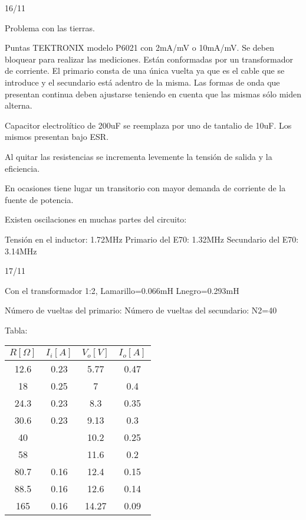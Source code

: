 16/11

Problema con las tierras.

Puntas TEKTRONIX modelo P6021 con 2mA/mV o 10mA/mV. Se deben bloquear para realizar las mediciones.
Están conformadas por un transformador de corriente. 
El primario consta de una única vuelta ya que es el cable que se introduce y el secundario está adentro de la misma. 
Las formas de onda que presentan continua deben ajustarse teniendo en cuenta que las mismas sólo miden alterna. 

Capacitor electrolítico de 200uF se reemplaza por uno de tantalio de 10uF. Los mismos presentan bajo ESR. 

Al quitar las resistencias se incrementa levemente la tensión de salida y la eficiencia. 

En ocasiones tiene lugar un transitorio con mayor demanda de corriente de la fuente de potencia. 

Existen oscilaciones en muchas partes del circuito:

Tensión en el inductor: 1.72MHz
Primario del E70: 1.32MHz
Secundario del E70: 3.14MHz

17/11

Con el transformador 1:2, 
Lamarillo=0.066mH
Lnegro=0.293mH

Número de vueltas del primario: 
Número de vueltas del secundario: N2=40 

Tabla:
 

\begin{table}[]
    \begin{tabular}{cccc}
    \hline
    $R[\Omega]$ & $I_i[A]$ & $V_o[V]$ & $I_o[A]$ \\ \hline
    12.6        & 0.23     & 5.77     & 0.47     \\
    18          & 0.25     & 7        & 0.4      \\
    24.3        & 0.23     & 8.3      & 0.35     \\
    30.6        & 0.23     & 9.13     & 0.3      \\
    40          &          & 10.2     & 0.25     \\
    58          &          & 11.6     & 0.2      \\
    80.7        & 0.16     & 12.4     & 0.15     \\
    88.5        & 0.16     & 12.6     & 0.14     \\
    165         & 0.16     & 14.27    & 0.09     \\ \hline
    \end{tabular}
\end{table}